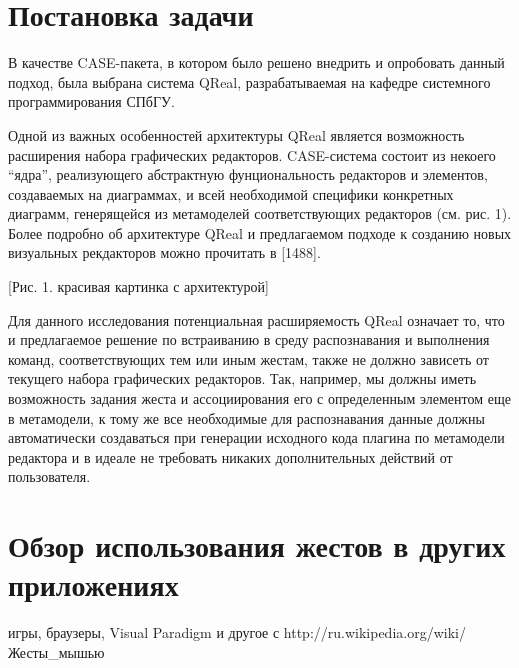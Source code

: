 \documentclass[a5paper]{article}
\begin{document}
\section{Постановка задачи}
В качестве CASE-пакета, в котором было решено внедрить и опробовать данный подход, была выбрана система QReal, разрабатываемая на кафедре 
системного программирования СПбГУ. 

Одной из важных особенностей архитектуры QReal является возможность расширения набора графических редакторов. CASE-система состоит из 
некоего ``ядра'', реализующего абстрактную фунциональность редакторов и элементов, создаваемых на диаграммах, и всей необходимой специфики 
конкретных диаграмм, генерящейся из метамоделей соответствующих редакторов (см. рис. 1). Более подробно об архитектуре QReal и предлагаемом 
подходе к  созданию новых визуальных рекдакторов можно прочитать в [1488]. 

[Рис. 1. красивая картинка с архитектурой]

Для данного исследования потенциальная расширяемость QReal означает то, что и предлагаемое решение по встраиванию в среду распознавания
и выполнения команд, соответствующих тем или иным жестам, также не должно зависеть от текущего набора графических редакторов. Так, например,
мы должны иметь возможность задания жеста и ассоциирования его с определенным элементом еще в метамодели, к тому же все необходимые 
для распознавания данные должны автоматически создаваться при генерации исходного кода плагина по метамодели редактора и в идеале не требовать 
никаких дополнительных действий от пользователя. 

\section{Обзор использования жестов в других приложениях}

игры, браузеры, Visual Paradigm и другое с http://ru.wikipedia.org/wiki/Жесты\_мышью
\end{document}
